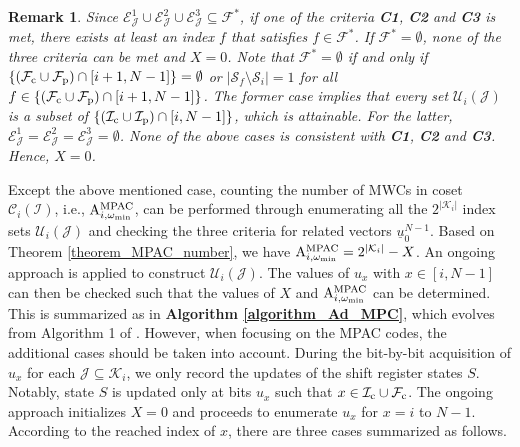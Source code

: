 \documentclass[12pt, draftclsnofoot, peerreview, onecolumn]{IEEEtran}
\theoremstyle{noparent}
\newtheorem{remark}[theorem]{\textbf{Remark}}
\begin{document}
\begin{remark}
    \label{remark_F_set}
    Since $\mathcal{E}_{\mathcal{J}}^{1}\cup\mathcal{E}_{\mathcal{J}}^{2}\cup\mathcal{E}_{\mathcal{J}}^{3}
    \subseteq \mathcal{F}^{*}$, if one of the criteria \textbf{C1}, \textbf{C2} and \textbf{C3} is met, 
    there exists at least an index $f$ that satisfies $f\in\mathcal{F}^{*}$.
    If $\mathcal{F}^{*}=\emptyset$, none of the three criteria can be met and $X=0$.
    Note that $\mathcal{F}^{*}=\emptyset$ if and only if 
    $\{(\mathcal{F}_{\rm c}\cup\mathcal{F}_{\rm p}) \cap [i+1,N-1]\}=\emptyset$ or
    $\left|\mathcal{S}_f \setminus \mathcal{S}_i\right|=1$ for all $f\in \{(\mathcal{F}_{\rm c}\cup\mathcal{F}_{\rm p}) \cap [i+1,N-1]\}$.
    The former case implies that every set $\mathcal{U}_i(\mathcal{J})$ is a subset of 
    $\{(\mathcal{I}_{\rm c}\cup\mathcal{I}_{\rm p}) \cap[i,N-1]\}$, which is attainable.
    For the latter, $\mathcal{E}_{\mathcal{J}}^{1}=\mathcal{E}_{\mathcal{J}}^{2}=\mathcal{E}_{\mathcal{J}}^{3}=\emptyset$.
    None of the above cases is consistent with \textbf{C1}, \textbf{C2} and \textbf{C3}. Hence, $X=0$.
\end{remark}

Except the above mentioned case, counting the number of MWCs in coset $\mathcal{C}_i(\mathcal{I})$, 
i.e., ${\rm A}_{i,\omega_{\rm{min}}}^{\rm{MPAC}}$,
can be performed through enumerating all the $2^{|\mathcal{K}_{i}|}$ index sets $\mathcal{U}_i(\mathcal{J})$
and checking the three criteria for related vectors $\underline{u}_0^{N-1}$.
Based on Theorem \ref{theorem_MPAC_number},
we have ${\rm A}_{i,\omega_{\rm{min}}}^{\rm{MPAC}}=2^{|\mathcal{K}_i|} - X$.
An ongoing approach is applied to construct $\mathcal{U}_i(\mathcal{J})$. The values of $u_x$ with $x\in[i,N-1]$ can then be checked such that the values of $X$
and ${\rm A}_{i,\omega_{\rm{min}}}^{\rm{MPAC}}$ can be determined.
This is summarized as in {\bf Algorithm \ref{algorithm_Ad_MPC}},
which evolves from Algorithm 1 of \cite{Rowshan2022FastEnumerationMinimum}.
However, when focusing on the MPAC codes, 
the additional cases should be taken into account.
During the bit-by-bit acquisition of $u_x$ for each $\mathcal{J}\subseteq\mathcal{K}_i$, 
we only record the updates of the shift register states $S$.
Notably, state $S$ is updated only at bits $u_x$ such that
$x\in \mathcal{I}_{\rm c}\cup \mathcal{F}_{\rm c}$.
The ongoing approach initializes $X=0$ and proceeds to enumerate $u_x$ for $x=i$ to $N-1$. According to the reached index of $x$, there are three cases summarized as follows.
\end{document}
